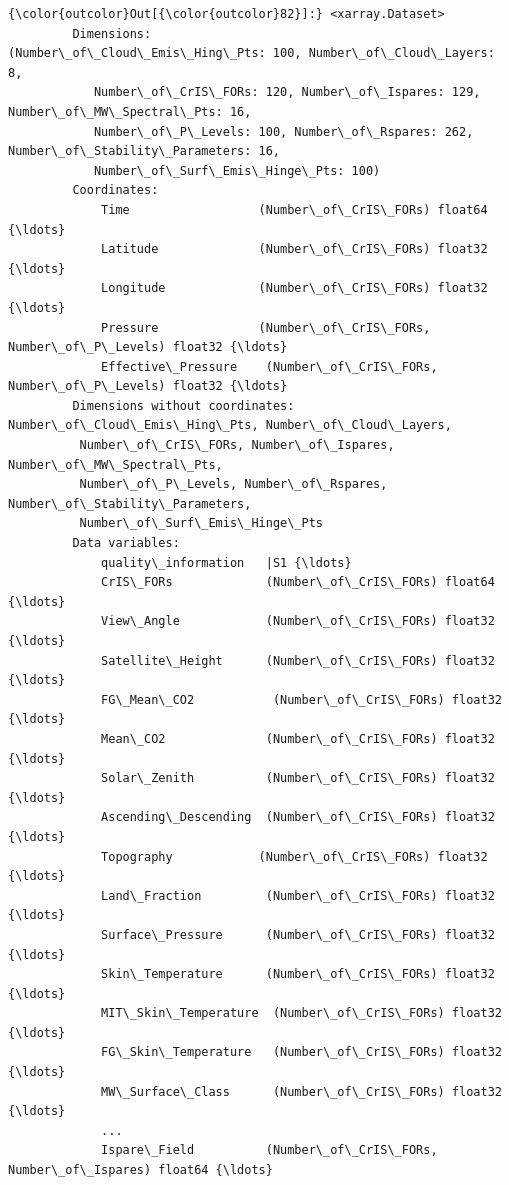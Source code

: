 \documentclass[11pt]{article}
\begin{document}
\begin{Verbatim}[commandchars=\\\{\}]
{\color{outcolor}Out[{\color{outcolor}82}]:} <xarray.Dataset>
         Dimensions:               (Number\_of\_Cloud\_Emis\_Hing\_Pts: 100, Number\_of\_Cloud\_Layers: 8,
            Number\_of\_CrIS\_FORs: 120, Number\_of\_Ispares: 129, Number\_of\_MW\_Spectral\_Pts: 16,
            Number\_of\_P\_Levels: 100, Number\_of\_Rspares: 262, Number\_of\_Stability\_Parameters: 16,
            Number\_of\_Surf\_Emis\_Hinge\_Pts: 100)
         Coordinates:
             Time                  (Number\_of\_CrIS\_FORs) float64 {\ldots}
             Latitude              (Number\_of\_CrIS\_FORs) float32 {\ldots}
             Longitude             (Number\_of\_CrIS\_FORs) float32 {\ldots}
             Pressure              (Number\_of\_CrIS\_FORs, Number\_of\_P\_Levels) float32 {\ldots}
             Effective\_Pressure    (Number\_of\_CrIS\_FORs, Number\_of\_P\_Levels) float32 {\ldots}
         Dimensions without coordinates: Number\_of\_Cloud\_Emis\_Hing\_Pts, Number\_of\_Cloud\_Layers,
          Number\_of\_CrIS\_FORs, Number\_of\_Ispares, Number\_of\_MW\_Spectral\_Pts,
          Number\_of\_P\_Levels, Number\_of\_Rspares, Number\_of\_Stability\_Parameters,
          Number\_of\_Surf\_Emis\_Hinge\_Pts
         Data variables:
             quality\_information   |S1 {\ldots}
             CrIS\_FORs             (Number\_of\_CrIS\_FORs) float64 {\ldots}
             View\_Angle            (Number\_of\_CrIS\_FORs) float32 {\ldots}
             Satellite\_Height      (Number\_of\_CrIS\_FORs) float32 {\ldots}
             FG\_Mean\_CO2           (Number\_of\_CrIS\_FORs) float32 {\ldots}
             Mean\_CO2              (Number\_of\_CrIS\_FORs) float32 {\ldots}
             Solar\_Zenith          (Number\_of\_CrIS\_FORs) float32 {\ldots}
             Ascending\_Descending  (Number\_of\_CrIS\_FORs) float32 {\ldots}
             Topography            (Number\_of\_CrIS\_FORs) float32 {\ldots}
             Land\_Fraction         (Number\_of\_CrIS\_FORs) float32 {\ldots}
             Surface\_Pressure      (Number\_of\_CrIS\_FORs) float32 {\ldots}
             Skin\_Temperature      (Number\_of\_CrIS\_FORs) float32 {\ldots}
             MIT\_Skin\_Temperature  (Number\_of\_CrIS\_FORs) float32 {\ldots}
             FG\_Skin\_Temperature   (Number\_of\_CrIS\_FORs) float32 {\ldots}
             MW\_Surface\_Class      (Number\_of\_CrIS\_FORs) float32 {\ldots}
             ...
             Ispare\_Field          (Number\_of\_CrIS\_FORs, Number\_of\_Ispares) float64 {\ldots}

\end{Verbatim}
\end{document}

